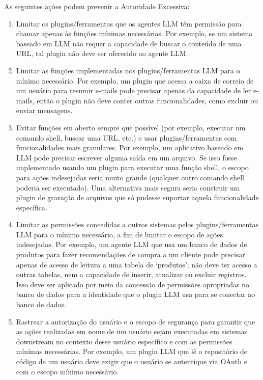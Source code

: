\documentclass[
]{article}
\providecommand{\tightlist}{%
  \setlength{\itemsep}{0pt}\setlength{\parskip}{0pt}}
\begin{document}
As seguintes ações podem prevenir a Autoridade Excessiva:

\begin{enumerate}
\def\labelenumi{\arabic{enumi}.}
\tightlist
\item
  Limitar os plugins/ferramentas que os agentes LLM têm permissão para
  chamar apenas às funções mínimas necessárias. Por exemplo, se um
  sistema baseado em LLM não requer a capacidade de buscar o conteúdo de
  uma URL, tal plugin não deve ser oferecido ao agente LLM.
\item
  Limitar as funções implementadas nos plugins/ferramentas LLM para o
  mínimo necessário. Por exemplo, um plugin que acessa a caixa de
  correio de um usuário para resumir e-mails pode precisar apenas da
  capacidade de ler e-mails, então o plugin não deve conter outras
  funcionalidades, como excluir ou enviar mensagens.
\item
  Evitar funções em aberto sempre que possível (por exemplo, executar um
  comando shell, buscar uma URL, etc.) e usar plugins/ferramentas com
  funcionalidades mais granulares. Por exemplo, um aplicativo baseado em
  LLM pode precisar escrever alguma saída em um arquivo. Se isso fosse
  implementado usando um plugin para executar uma função shell, o escopo
  para ações indesejadas seria muito grande (qualquer outro comando
  shell poderia ser executado). Uma alternativa mais segura seria
  construir um plugin de gravação de arquivos que só pudesse suportar
  aquela funcionalidade específica.
\item
  Limitar as permissões concedidas a outros sistemas pelos
  plugins/ferramentas LLM para o mínimo necessário, a fim de limitar o
  escopo de ações indesejadas. Por exemplo, um agente LLM que usa um
  banco de dados de produtos para fazer recomendações de compra a um
  cliente pode precisar apenas de acesso de leitura a uma tabela de
  `produtos'; não deve ter acesso a outras tabelas, nem a capacidade de
  inserir, atualizar ou excluir registros. Isso deve ser aplicado por
  meio da concessão de permissões apropriadas no banco de dados para a
  identidade que o plugin LLM usa para se conectar ao banco de dados.
\item
  Rastrear a autorização do usuário e o escopo de segurança para
  garantir que as ações realizadas em nome de um usuário sejam
  executadas em sistemas downstream no contexto desse usuário específico
  e com as permissões mínimas necessárias. Por exemplo, um plugin LLM
  que lê o repositório de código de um usuário deve exigir que o usuário
  se autentique via OAuth e com o escopo mínimo necessário.

\end{enumerate}
\end{document}
